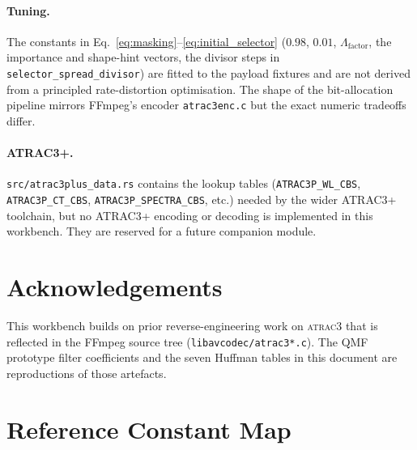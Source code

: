 \documentclass[11pt]{article}
\begin{document}
\paragraph{Tuning.} The constants in
Eq.~\ref{eq:masking}--\ref{eq:initial_selector}
(\(0.98\), \(0.01\), \(\Lambda_{\text{factor}}\), the importance and
shape-hint vectors, the divisor steps in
\texttt{selector\_spread\_divisor}) are fitted to the payload fixtures
and are not derived from a principled rate-distortion optimisation. The
shape of the bit-allocation pipeline mirrors FFmpeg's encoder
\texttt{atrac3enc.c} but the exact numeric tradeoffs differ.

\paragraph{ATRAC3+.} \texttt{src/atrac3plus\_data.rs} contains the lookup
tables (\texttt{ATRAC3P\_WL\_CBS}, \texttt{ATRAC3P\_CT\_CBS},
\texttt{ATRAC3P\_SPECTRA\_CBS}, etc.) needed by the wider ATRAC3+
toolchain, but no ATRAC3+ encoding or decoding is implemented in this
workbench. They are reserved for a future companion module.

\section*{Acknowledgements}

This workbench builds on prior reverse-engineering work on
\textsc{atrac3} that is reflected in the FFmpeg source tree
(\texttt{libavcodec/atrac3*.c}). The QMF prototype filter coefficients
and the seven Huffman tables in this document are reproductions of those
artefacts.

\appendix
\section{Reference Constant Map}
\label{app:constants}
\end{document}
